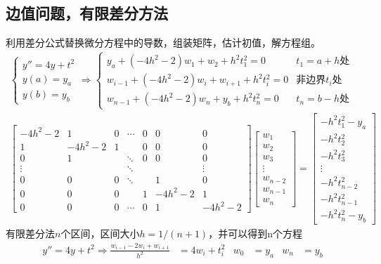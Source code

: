 \documentclass[twocolumn]{article}
\begin{document}
\subsection{边值问题，有限差分方法}
利用差分公式替换微分方程中的导数，组装矩阵，估计初值，解方程组。
\begin{align*}
    \begin{cases}
        y''=4y+t^2 \\
        y(a)=y_a   \\
        y(b)=y_b
    \end{cases}
    \Rightarrow
    \begin{cases}
        y_a+(-4h^2-2)w_1+w_2+h^2t_1^2=0         & t_1=a+h\text{处}          \\
        w_{i-1}+(-4h^2-2)w_i+w_{i+1}+h^2t_i^2=0 & \text{非边界}t_i\text{处} \\
        w_{n-1}+(-4h^2-2)w_n+y_b+h^2t_n^2=0     & t_n=b-h\text{处}
    \end{cases} \\
    \begin{bmatrix}
        -4h^2-2 & 1       & 0 & \cdots & 0 & 0       & 0       \\
        1       & -4h^2-2 & 1 &        & 0 & 0       & 0       \\
        0       & 1       &   & \ddots & 0 & 0       & 0       \\
        \vdots  &         &   & \ddots &   &         & \vdots  \\
        0       & 0       & 0 & \ddots &   & 1       & 0       \\
        0       & 0       & 0 &        & 1 & -4h^2-2 & 1       \\
        0       & 0       & 0 & \cdots & 0 & 1       & -4h^2-2
    \end{bmatrix}
    \begin{bmatrix}
        w_1     \\
        w_2     \\
        w_3     \\
        \vdots  \\
        w_{n-2} \\
        w_{n-1} \\
        w_n
    \end{bmatrix}
    =
    \begin{bmatrix}
        -h^2t_1^2-y_a \\
        -h^2t_2^2     \\
        -h^2t_3^2     \\
        \vdots        \\
        -h^2t_{n-2}^2 \\
        -h^2t_{n-1}^2 \\
        -h^2t_n^2-y_b
    \end{bmatrix}
\end{align*}
有限差分法$n$个区间，区间大小$h=1/(n+1)$，并可以得到n个方程
\begin{align*}
    y''=4y+t^2\Rightarrow\frac{w_{i-1}-2w_i+w_{i+1}}{h^2} & =4w_i+t_i^2 & w_0 & =y_a & w_n & =y_b
\end{align*}
\end{document}
